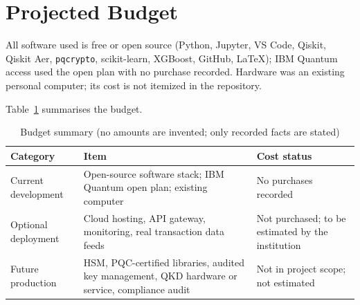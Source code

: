 \section{Projected Budget}
All software used is free or open source (Python, Jupyter, VS Code, Qiskit, Qiskit Aer, \texttt{pqcrypto}, scikit-learn, XGBoost, GitHub, \LaTeX); IBM Quantum access used the open plan with no purchase recorded. Hardware was an existing personal computer; its cost is not itemized in the repository.

Table~\ref{tab:budget} summarises the budget.

\begin{table}[ht]
\centering\small
\caption{Budget summary (no amounts are invented; only recorded facts are stated)}
\label{tab:budget}
\begin{tabular}{@{}p{3.2cm}p{5.2cm}p{5.2cm}@{}}
\toprule
Category & Item & Cost status\\
\midrule
Current development & Open-source software stack; IBM Quantum open plan; existing computer & No purchases recorded\\
Optional deployment & Cloud hosting, API gateway, monitoring, real transaction data feeds & Not purchased; to be estimated by the institution\\
Future production & HSM, PQC-certified libraries, audited key management, QKD hardware or service, compliance audit & Not in project scope; not estimated\\
\bottomrule
\end{tabular}
\end{table}
